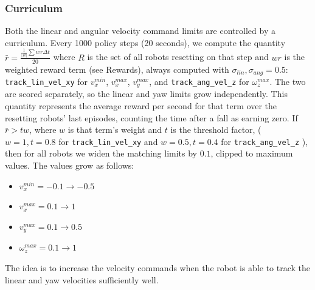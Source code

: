 \documentclass[11pt]{article}
\newcommand{\code}[1]{%
    \colorbox{mdBg}{\textcolor{mdText}{\texttt{#1}}}%
}
\begin{document}
\subsubsection*{Curriculum}
Both the linear and angular velocity command limits are controlled by a curriculum. Every 1000 policy steps (20 seconds), we compute the quantity $\bar r = \frac{\frac{1}{|R|}\sum wr\Delta t}{20}$ where $R$ is the set of all robots resetting on that step and $wr$ is the weighted reward term (see Rewards), always computed with $\sigma_{lin}, \sigma_{ang}=0.5$: \code{track\_lin\_vel\_xy} for $v_x^{min}$, $v_x^{max}$, $v_y^{max}$, and \code{track\_ang\_vel\_z} for $\omega_z^{max}$. The two are scored separately, so the linear and yaw limits grow independently. This quantity represents the average reward per second for that term over the resetting robots' last episodes, counting the time after a fall as earning zero. If $\bar r > tw$, where $w$ is that term's weight and $t$ is the threshold factor, ($w=1, t=0.8$ for \code{track\_lin\_vel\_xy} and $w=0.5,t=0.4$ for \code{track\_ang\_vel\_z}), then for all robots we widen the matching limits by $0.1$, clipped to maximum values. The values grow as follows:
\begin{itemize}
    \item $v_x^{min} = -0.1 \rightarrow -0.5$
    \item $v_x^{max} = 0.1 \rightarrow 1$
    \item $v_y^{max} = 0.1 \rightarrow 0.5$
    \item $\omega_z^{max}= 0.1 \rightarrow 1$
\end{itemize}
The idea is to increase the velocity commands when the robot is able to track the linear and yaw velocities sufficiently well.
\end{document}
